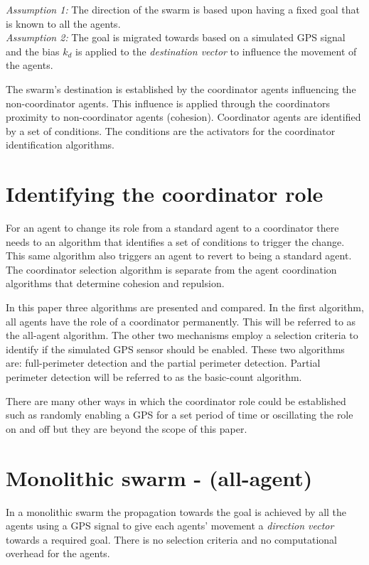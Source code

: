 \documentclass{ieeeaccess}
\begin{document}
\textit{Assumption 1:} The direction of the swarm is based upon having a fixed goal that is known to all the agents. \\
\textit{Assumption 2:} The goal is migrated towards based on a simulated GPS signal and the bias $k_d$ is applied to the \textit{destination vector} to influence the movement of the agents. 

The swarm's destination is established by the coordinator agents influencing the non-coordinator agents. This influence is applied through the coordinators proximity to non-coordinator agents (cohesion). Coordinator agents are identified by a set of conditions. The conditions are the activators for the coordinator identification algorithms.

\section{Identifying the coordinator role}\label{sec:CoordRole}
For an agent to change its role from a standard agent to a coordinator there needs to an algorithm that identifies a set of conditions to trigger the change. This same algorithm also triggers an agent to revert to being a standard agent. The coordinator selection algorithm is separate from the agent coordination algorithms that determine cohesion and repulsion.

In this paper three algorithms are presented and compared. In the first algorithm, all agents have the role of a coordinator permanently. This will be referred to as the all-agent algorithm. The other two mechanisms employ a selection criteria to identify if the simulated GPS sensor should be enabled. These two algorithms are: full-perimeter detection and the partial perimeter detection. Partial perimeter detection will be referred to as the basic-count algorithm.

There are many other ways in which the coordinator role could be established such as randomly enabling a GPS for a set period of time or oscillating the role on and off but they are beyond the scope of this paper.

\section{Monolithic swarm - (all-agent)}\label{sec:AllAgents} 
In a monolithic swarm \cite{BS:13} the propagation towards the goal is achieved by all the agents using a GPS signal to give each agents' movement a \textit{direction vector} towards a required goal. There is no selection criteria and no computational overhead for the agents.
\end{document}
